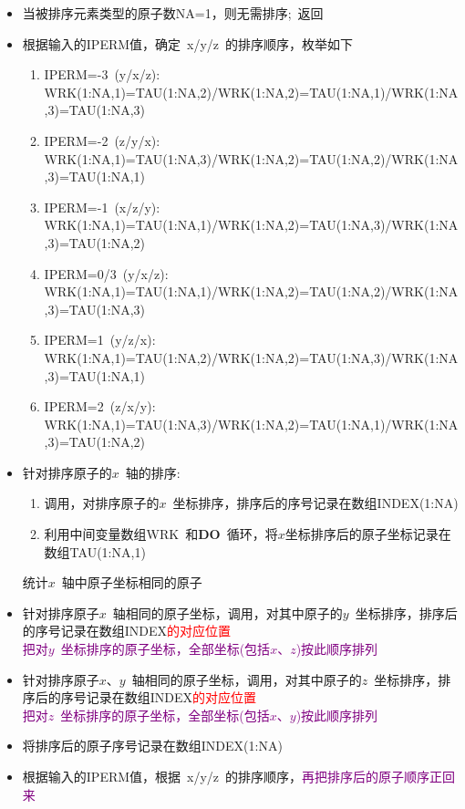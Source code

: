 \documentclass{article}      %
\begin{document}
\begin{itemize}
	\item 当被排序元素类型的原子数\textrm{NA}=1，则无需排序;~返回
	\item 根据输入的\textrm{IPERM}值，确定~\textrm{x/y/z}~的排序顺序，枚举如下
		\begin{enumerate}
			\item \textrm{IPERM=-3~(y/x/z):\\WRK(1:NA,1)=TAU(1:NA,2)/WRK(1:NA,2)=TAU(1:NA,1)/WRK(1:NA,3)=TAU(1:NA,3)}
			\item \textrm{IPERM=-2~(z/y/x):~\\WRK(1:NA,1)=TAU(1:NA,3)/WRK(1:NA,2)=TAU(1:NA,2)/WRK(1:NA,3)=TAU(1:NA,1)}
			\item \textrm{IPERM=-1~(x/z/y):\\WRK(1:NA,1)=TAU(1:NA,1)/WRK(1:NA,2)=TAU(1:NA,3)/WRK(1:NA,3)=TAU(1:NA,2)}
			\item \textrm{IPERM=0/3~(y/x/z):\\WRK(1:NA,1)=TAU(1:NA,1)/WRK(1:NA,2)=TAU(1:NA,2)/WRK(1:NA,3)=TAU(1:NA,3)}
			\item \textrm{IPERM=1~(y/z/x):\\WRK(1:NA,1)=TAU(1:NA,2)/WRK(1:NA,2)=TAU(1:NA,3)/WRK(1:NA,3)=TAU(1:NA,1)}
			\item \textrm{IPERM=2~(z/x/y):\\WRK(1:NA,1)=TAU(1:NA,3)/WRK(1:NA,2)=TAU(1:NA,1)/WRK(1:NA,3)=TAU(1:NA,2)}
		\end{enumerate}
	\item 针对排序原子的$x$~轴的排序:
		\begin{enumerate}
			\item 调用，对排序原子的$x$~坐标排序，排序后的序号记录在数组\textrm{INDEX(1:NA)}
			\item 利用中间变量数组\textrm{WRK}~和\textbf{DO}~循环，将$x$坐标排序后的原子坐标记录在数组\textrm{TAU(1:NA,1)}
		\end{enumerate}
		统计$x$~轴中原子坐标相同的原子
	\item 针对排序原子$x$~轴相同的原子坐标，调用，对其中原子的$y$~坐标排序，排序后的序号记录在数组\textrm{INDEX}\textcolor{red}{的对应位置}\\
		\textcolor{purple}{把对$y$~坐标排序的原子坐标，全部坐标(包括$x$、$z$)按此顺序排列}
	\item 针对排序原子$x$、$y$~轴相同的原子坐标，调用，对其中原子的$z$~坐标排序，排序后的序号记录在数组\textrm{INDEX}\textcolor{red}{的对应位置}\\
		\textcolor{purple}{把对$z$~坐标排序的原子坐标，全部坐标(包括$x$、$y$)按此顺序排列}
	\item 将排序后的原子序号记录在数组\textrm{INDEX(1:NA)}
	\item 根据输入的\textrm{IPERM}值，根据~\textrm{x/y/z}~的排序顺序，\textcolor{purple}{再把排序后的原子顺序正回来}
\end{itemize}
\end{document}
